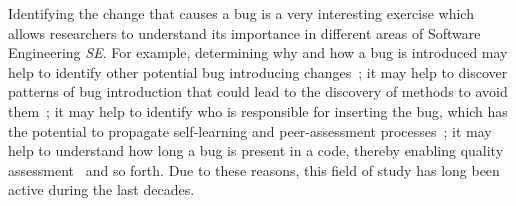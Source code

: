 \documentclass[a4paper, 12pt]{book}
\begin{document}
Identifying the change that causes a bug is a very interesting exercise which allows researchers to understand its importance in different areas of Software Engineering \emph{SE}. For example, determining why and how a bug is introduced may help to identify other potential bug introducing changes~\cite{sliwerski2005changes,kim2006automatic,zimmermann2006mining,thung2013automatic,sinha2010buginnings}; it may help to discover patterns of bug introduction that could lead to the discovery of methods to avoid them~\cite{nagappan2006mining,zimmermann2007predicting,hassan2009predicting,hassan2005top,kim2007predicting}; it may help to identify who is responsible for inserting the bug, which has the potential to propagate self-learning and peer-assessment processes~\cite{izquierdo2011developers,da2014unveiling,ell2013identifying}; it may help to understand how long a bug is present in a code, thereby enabling quality assessment~\cite{rodriguez2017much,chen2014empirical,weiss2007long} and so forth. Due to these reasons, this field of study has long been active during the last decades. 
\end{document}
